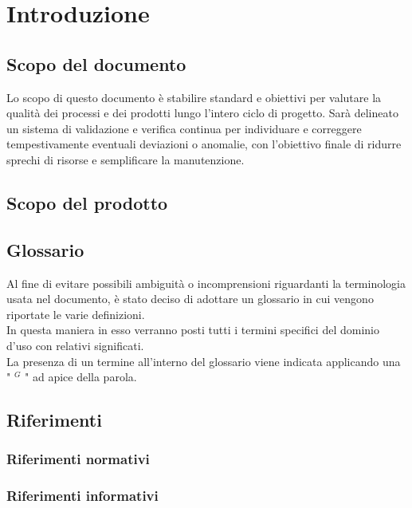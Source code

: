 
\section{Introduzione}
\subsection{Scopo del documento}
Lo scopo di questo documento è stabilire standard e obiettivi per valutare la qualità
dei processi e dei prodotti lungo l'intero ciclo di progetto. Sarà delineato un sistema
di validazione e verifica continua per individuare e correggere tempestivamente
eventuali deviazioni o anomalie, con l'obiettivo finale di ridurre sprechi di risorse e
semplificare la manutenzione.
\subsection{Scopo del prodotto}
\subsection{Glossario}
Al fine di evitare possibili ambiguità o incomprensioni riguardanti la terminologia usata nel documento, è stato deciso di adottare un glossario in cui vengono riportate le varie definizioni.  \\
In questa maniera in esso verranno posti tutti i termini specifici del dominio d’uso con relativi significati. \\
La presenza di un termine all’interno del glossario viene indicata applicando una " $^{G}$ " ad apice della parola.
\subsection{Riferimenti}
\subsubsection{Riferimenti normativi}
\subsubsection{Riferimenti informativi}

